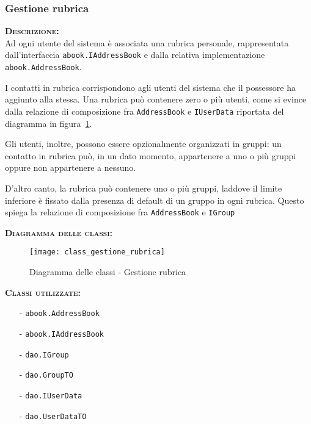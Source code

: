 \subsubsection{Gestione rubrica}
\begin{description}
	\item{\scshape\bfseries Descrizione:}\\
Ad ogni utente del sistema è associata una rubrica personale, rappresentata dall'interfaccia \texttt{abook.IAddressBook} e dalla relativa implementazione \texttt{abook.AddressBook}.

I contatti in rubrica corrispondono agli utenti del sistema che il possessore ha aggiunto alla stessa. Una rubrica può contenere zero o più utenti, come si evince dalla relazione di composizione fra \texttt{AddressBook} e \texttt{IUserData} riportata del diagramma in figura~\ref{fig:gestionerubrica}.

Gli utenti, inoltre, possono essere opzionalmente organizzati in gruppi: un contatto in rubrica può, in un dato momento, appartenere a uno o più gruppi oppure non appartenere a nessuno.

D'altro canto, la rubrica può contenere uno o più gruppi, laddove il limite inferiore è fissato dalla presenza di default di un gruppo  in ogni rubrica. Questo spiega la relazione di composizione fra \texttt{AddressBook} e \texttt{IGroup}

	\item{\scshape\bfseries Diagramma delle classi:}
\begin{figure}[H]
  \centering
  \texttt{[image: class\_gestione\_rubrica]}
  \caption{Diagramma delle classi - Gestione rubrica}\label{fig:gestionerubrica}
\end{figure}
	
	\item{\scshape\bfseries Classi utilizzate:}\\
	\begin{itemize}[nolistsep, noitemsep]
	  \item[-] \texttt{abook.AddressBook}
	  \item[-] \texttt{abook.IAddressBook}
	  \item[-] \texttt{dao.IGroup}
	  \item[-] \texttt{dao.GroupTO}
	  \item[-] \texttt{dao.IUserData}
	  \item[-] \texttt{dao.UserDataTO}
	\end{itemize}
\end{description}

